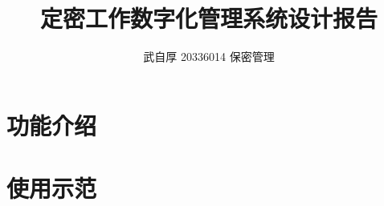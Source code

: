 \documentclass{mystyle}
\title{\textbf{定密工作数字化管理系统设计报告}}
\author{武自厚 \hspace{1em} 20336014 \hspace{1em} 保密管理}
\begin{document}
    \maketitle
    \section{功能介绍}
    
    \section{使用示范}
    
\end{document}
